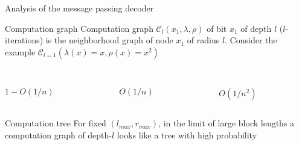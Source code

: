 \begin{frame}{Analysis of the message passing decoder}
\begin{block}{Computation graph}
Computation graph $\mathcal{C}_{l}(x_1,\lambda,\rho)$ of bit $x_{1}$ of depth $l$ ($l$-iterations) is the neighborhood graph of node $x_1$ of radius $l$. \pause Consider the example $\mathcal{C}_{l=1}(\lambda(x)=x,\rho(x)=x^2)$
\end{block}

\begin{columns}
\begin{column}{0.33\textwidth}
\begin{center}
\scalebox{0.6}{}
\\$1-O(1/n)$
\end{center}
\end{column}

\begin{column}{0.33\textwidth}
\begin{center}
\scalebox{0.6}{}
\\$O(1/n)$
\end{center}
\end{column}

\begin{column}{0.33\textwidth}
\begin{center}
\scalebox{0.6}{}
\\$O(1/n^2)$
\end{center}
\end{column}

\end{columns}
\pause
\begin{block}{Computation tree}
For fixed $(l_{max},r_{max})$, in the limit of large block lengths a computation graph of depth-$l$ looks like a tree with high probability
\end{block}
\end{frame}
